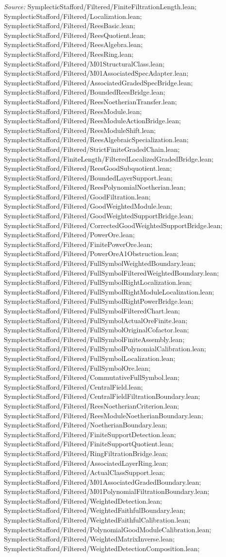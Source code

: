 \emph{Source:} SymplecticStafford/Filtered/FiniteFiltrationLength.lean; SymplecticStafford/Filtered/Localization.lean; SymplecticStafford/Filtered/ReesBasic.lean; SymplecticStafford/Filtered/ReesQuotient.lean; SymplecticStafford/Filtered/ReesAlgebra.lean; SymplecticStafford/Filtered/ReesRing.lean; SymplecticStafford/Filtered/M01StructuralClass.lean; SymplecticStafford/Filtered/M01AssociatedSpecAdapter.lean; SymplecticStafford/Filtered/AssociatedGradedSpecBridge.lean; SymplecticStafford/Filtered/BoundedReesBridge.lean; SymplecticStafford/Filtered/ReesNoetherianTransfer.lean; SymplecticStafford/Filtered/ReesModule.lean; SymplecticStafford/Filtered/ReesModuleActionBridge.lean; SymplecticStafford/Filtered/ReesModuleShift.lean; SymplecticStafford/Filtered/ReesAlgebraicSpecialization.lean; SymplecticStafford/Filtered/StrictFiniteGradedChain.lean; SymplecticStafford/FiniteLength/FilteredLocalizedGradedBridge.lean; SymplecticStafford/Filtered/ReesGoodSubquotient.lean; SymplecticStafford/Filtered/BoundedLayerSupport.lean; SymplecticStafford/Filtered/ReesPolynomialNoetherian.lean; SymplecticStafford/Filtered/GoodFiltration.lean; SymplecticStafford/Filtered/GoodWeightedModule.lean; SymplecticStafford/Filtered/GoodWeightedSupportBridge.lean; SymplecticStafford/Filtered/CorrectedGoodWeightedSupportBridge.lean; SymplecticStafford/Filtered/PowerOre.lean; SymplecticStafford/Filtered/FinitePowerOre.lean; SymplecticStafford/Filtered/PowerOreA1Obstruction.lean; SymplecticStafford/Filtered/FullSymbolWeightedBoundary.lean; SymplecticStafford/Filtered/FullSymbolFilteredWeightedBoundary.lean; SymplecticStafford/Filtered/FullSymbolRightLocalization.lean; SymplecticStafford/Filtered/FullSymbolRightModuleLocalization.lean; SymplecticStafford/Filtered/FullSymbolRightPowerBridge.lean; SymplecticStafford/Filtered/FullSymbolFilteredChart.lean; SymplecticStafford/Filtered/FullSymbolActualOreFinite.lean; SymplecticStafford/Filtered/FullSymbolOriginalCofactor.lean; SymplecticStafford/Filtered/FullSymbolFiniteAssembly.lean; SymplecticStafford/Filtered/FullSymbolPolynomialCalibration.lean; SymplecticStafford/Filtered/FullSymbolLocalization.lean; SymplecticStafford/Filtered/FullSymbolOre.lean; SymplecticStafford/Filtered/CommutativeFullSymbol.lean; SymplecticStafford/Filtered/CentralField.lean; SymplecticStafford/Filtered/CentralFieldFiltrationBoundary.lean; SymplecticStafford/Filtered/ReesNoetherianCriterion.lean; SymplecticStafford/Filtered/ReesModuleNoetherianBoundary.lean; SymplecticStafford/Filtered/NoetherianBoundary.lean; SymplecticStafford/Filtered/FiniteSupportDetection.lean; SymplecticStafford/Filtered/FiniteSupportQuotient.lean; SymplecticStafford/Filtered/RingFiltrationBridge.lean; SymplecticStafford/Filtered/AssociatedLayerRing.lean; SymplecticStafford/Filtered/ActualClassSupport.lean; SymplecticStafford/Filtered/M01AssociatedGradedBoundary.lean; SymplecticStafford/Filtered/M01PolynomialFiltrationBoundary.lean; SymplecticStafford/Filtered/WeightedDetection.lean; SymplecticStafford/Filtered/WeightedFaithfulBoundary.lean; SymplecticStafford/Filtered/WeightedFaithfulCalibration.lean; SymplecticStafford/Filtered/PolynomialGoodModuleCalibration.lean; SymplecticStafford/Filtered/WeightedMatrixInverse.lean; SymplecticStafford/Filtered/WeightedDetectionComposition.lean; 